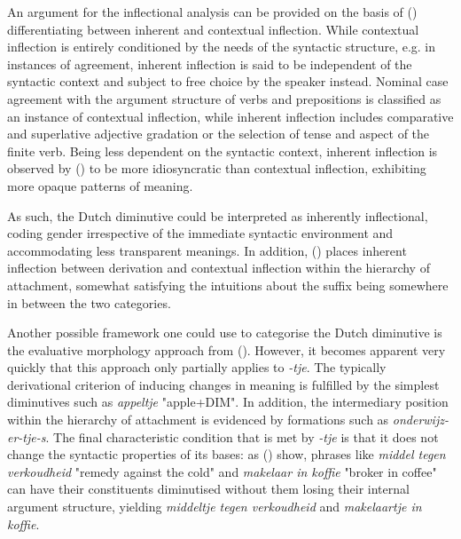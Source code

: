 An argument for the inflectional analysis can be provided on the basis of \citeauthor{Booij+2000} (\citeyear{Booij+2000}) differentiating between inherent and contextual inflection. While contextual inflection is entirely conditioned by the needs of the syntactic structure, e.g. in instances of agreement, inherent inflection is said to be independent of the syntactic context and subject to free choice by the speaker instead. Nominal case agreement with the argument structure of verbs and prepositions is classified as an instance of contextual inflection, while inherent inflection includes comparative and superlative adjective gradation or the selection of tense and aspect of the finite verb. Being less dependent on the syntactic context, inherent inflection is observed by \citeauthor{Booij+2000} (\citeyear{Booij+2000}) to be more idiosyncratic than contextual inflection, exhibiting more opaque patterns of meaning.

As such, the Dutch diminutive could be interpreted as inherently inflectional, coding gender irrespective of the immediate syntactic environment and accommodating less transparent meanings. In addition, \citeauthor{Booij+2000} (\citeyear{Booij+2000}) places inherent inflection between derivation and contextual inflection within the hierarchy of attachment, somewhat satisfying the intuitions about the suffix being somewhere in between the two categories.

Another possible framework one could use to categorise the Dutch diminutive is the evaluative morphology approach from \citeauthor{Scalise+1986} (\citeyear{Scalise+1986}). However, it becomes apparent very quickly that this approach only partially applies to \textit{-tje}. The typically derivational criterion of inducing changes in meaning is fulfilled by the simplest diminutives such as \textit{appeltje} "apple+DIM". In addition, the intermediary position within the hierarchy of attachment is evidenced by formations such as \textit{onderwijz-er-tje-s}. The final characteristic condition that is met by \textit{-tje} is that it does not change the syntactic properties of its bases: as \citeauthor{taalportaal} (\citeyear{taalportaal}) show, phrases like \textit{middel tegen verkoudheid} "remedy against the cold" and \textit{makelaar in koffie} "broker in coffee" can have their constituents diminutised without them losing their internal argument structure, yielding \textit{middeltje tegen verkoudheid} and \textit{makelaartje in koffie}.

